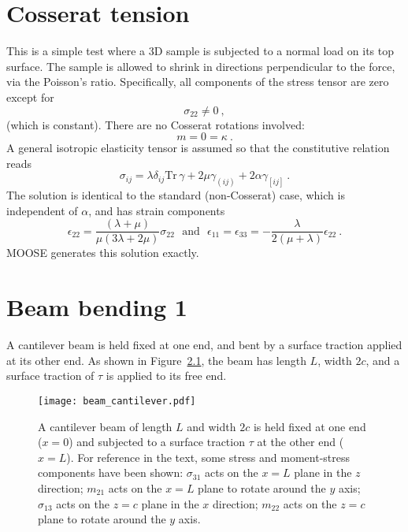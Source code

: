 \documentclass[]{scrreprt}
\newcommand{\si}{\sigma}
\newcommand{\ga}{\gamma}
\newcommand{\de}{\delta}
\newcommand{\la}{\lambda}
\newcommand{\tr}{\mbox{Tr}\,}
\newcommand{\al}{\alpha}
\begin{document}
\chapter{Cosserat tension}

This is a simple test where a 3D sample is subjected to a normal load
on its top surface.  The sample is allowed to shrink in directions
perpendicular to the force, via the Poisson's ratio.  Specifically,
all components of the stress tensor are zero except for
\begin{equation}
\sigma_{22} \neq 0 \ ,
\end{equation}
(which is constant).
There are no Cosserat rotations involved:
\begin{equation}
m = 0 = \kappa \ .
\end{equation}
A general isotropic elasticity tensor is assumed so that the
constitutive relation reads
\begin{equation}
\si_{ij} = \la\de_{ij}\tr\ga + 2\mu\ga_{(ij)} + 2\al\ga_{[ij]} \ .
\end{equation}
The solution is identical to the standard (non-Cosserat) case, which
is independent of $\al$, and has strain components
\begin{equation}
\epsilon_{22} = \frac{(\la + \mu)}{\mu(3\la + 2\mu)}\sigma_{22}
\ \ \ \mbox{and}\ \ \
\epsilon_{11} = \epsilon_{33} = -\frac{\la}{2(\mu + \la)}\epsilon_{22}
\ .
\end{equation}
MOOSE generates this solution exactly.


\chapter{Beam bending 1}

A cantilever beam is held fixed at one end, and bent by a surface
traction applied at its other end.  As shown in
Figure~\ref{beam_cant.fig}, the beam has length $L$, width $2c$, and a
surface traction of $\tau$ is applied to its free end.

\begin{figure}[htb]
\begin{center}
\texttt{[image: beam\_cantilever.pdf]}
\caption{A cantilever beam of length $L$ and width $2c$ is held fixed
  at one end ($x=0$) and subjected to a surface traction $\tau$ at the
  other end ($x=L$).  For reference in the text, some stress and
  moment-stress components have been shown: $\sigma_{31}$ acts on the
  $x=L$ plane in the $z$ direction; $m_{21}$ acts on the $x=L$ plane to
  rotate around the $y$ axis; $\sigma_{13}$ acts on the $z=c$ plane in
  the $x$ direction; $m_{22}$ acts on the $z=c$ plane to rotate around
  the $y$ axis.}
\label{beam_cant.fig}
\end{center}
\end{figure}
\end{document}

